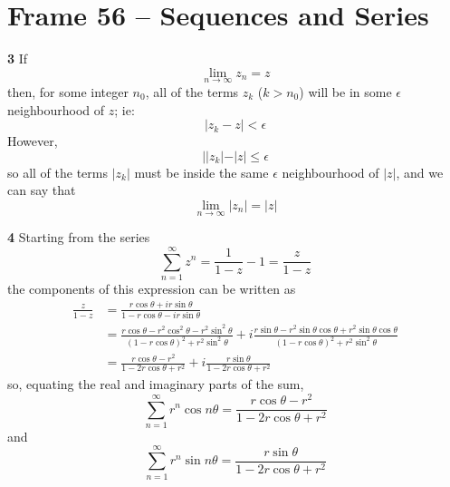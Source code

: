 \documentclass{article}
\begin{document}
\section{Frame 56 -- Sequences and Series}

\textbf{3}
If
\[
	\lim_{n \to \infty} z_n = z
\]
then, for some integer $n_0$, all of the terms $z_k$ ($k > n_0$) will be in some $\epsilon$ neighbourhood of $z$; ie:
\[
	|z_k - z| < \epsilon
\]
However,
\[
	||z_k| - |z| \le \epsilon
\]
so all of the terms $|z_k|$ must be inside the same $\epsilon$ neighbourhood of $|z|$, and we can say that
\[
	\lim_{n \to \infty} |z_n| = |z|
\]

\textbf{4}
Starting from the series
\[
	\sum_{n=1}^\infty z^n = \frac{1}{1 - z} - 1 = \frac{z}{1 - z}
\]
the components of this expression can be written as
\begin{align*}
	\frac{z}{1 - z}
	&= \frac{r \cos \theta + i r \sin \theta}{1 - r \cos \theta - i r \sin \theta} \\
	&= \frac{r\cos \theta - r^2 \cos^2 \theta - r^2 \sin^2 \theta}{(1 - r\cos \theta)^2 + r^2 \sin^2 \theta}
	+ i \frac{r\sin \theta - r^2 \sin \theta \cos \theta + r^2 \sin \theta \cos \theta}{(1 - r\cos \theta)^2 + r^2 \sin^2 \theta} \\
	&= \frac{r \cos \theta - r^2}{1 - 2r\cos \theta + r^2}
	+ i\frac{r\sin \theta}{1 - 2r\cos \theta + r^2}
\end{align*}
so, equating the real and imaginary parts of the sum,
\[
	\sum_{n=1}^\infty r^n \cos n\theta
	= \frac{r \cos \theta - r^2}{1 - 2r\cos \theta + r^2}
\]
and
\[
	\sum_{n=1}^\infty r^n \sin n\theta
	= \frac{r\sin \theta}{1 - 2r\cos \theta + r^2}
\]
\end{document}
